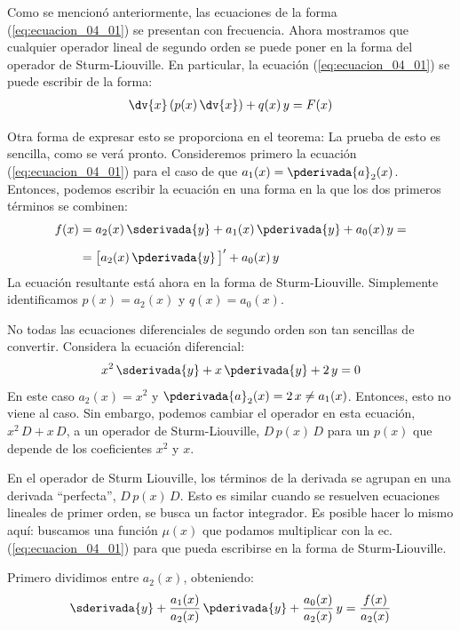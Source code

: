 \par
Como se mencionó anteriormente, las ecuaciones de la forma (\ref{eq:ecuacion_04_01}) se presentan con frecuencia. Ahora mostramos que cualquier operador lineal de segundo orden se puede poner en la forma del operador de Sturm-Liouville. En particular, la ecuación (\ref{eq:ecuacion_04_01}) se puede escribir de la forma:
\begin{align}
\dv{x} \left( p(x) \, \dv{x} \right) + q(x) \, y =  F(x)
\label{eq:ecuacion_04_05}
\end{align}

Otra forma de expresar esto se proporciona en el teorema: La prueba de esto es sencilla, como se verá pronto. Consideremos primero la ecuación (\ref{eq:ecuacion_04_01}) para el caso de que $a_{1} (x) = \pderivada{a}_{2} (x)$. Entonces, podemos escribir la ecuación en una forma en la que los dos primeros términos se combinen:
\begin{align}
\begin{aligned}
f(x) &= a_{2} (x) \, \sderivada{y} + a_{1} (x) \, \pderivada{y} + a_{0} (x) \, y = \\[0.5em]
&= \big[ a_{2} (x) \, \pderivada{y} \, \big]^{\prime} + a_{0} (x) \, y
\end{aligned}
\label{eq:ecuacion_04_06}
\end{align}
La ecuación resultante está ahora en la forma de Sturm-Liouville. Simplemente identificamos $p(x) = a_{2} (x)$ y $q (x) = a_{0} (x)$.
\par
No todas las ecuaciones diferenciales de segundo orden son tan sencillas de convertir. Considera la ecuación diferencial:
\begin{align*}
x^{2} \, \sderivada{y} + x \, \pderivada{y} + 2 \, y = 0
\end{align*}
En este caso $a_{2} (x) = x^{2}$ y $\pderivada{a}_{2} (x) = 2 \, x \neq a_{1} (x)$. Entonces, esto no viene al caso. Sin embargo, podemos cambiar el operador en esta ecuación, $x^{2} \, D + x \, D$, a un operador de Sturm-Liouville, $D \, p (x) \, D$ para un $p (x)$ que depende de los coeficientes $x^{2}$ y $x$.
\par
En el operador de Sturm Liouville, los términos de la derivada se agrupan en una derivada \enquote{perfecta}, $D \, p (x) \, D$. Esto es similar cuando se resuelven ecuaciones lineales de primer orden, se busca un factor integrador. Es posible hacer lo mismo aquí: buscamos una función $\mu (x)$ que podamos multiplicar con la ec. (\ref{eq:ecuacion_04_01}) para que pueda escribirse en la forma de Sturm-Liouville.
\par
Primero dividimos entre $a_{2} (x)$, obteniendo:
\begin{align*}
\sderivada{y} + \dfrac{a_{1}(x)}{a_{2}(x)} \, \pderivada{y} + \dfrac{a_{0}(x)}{a_{2}(x)} \, y = \dfrac{f(x)}{a_{2}(x)}
\end{align*}

